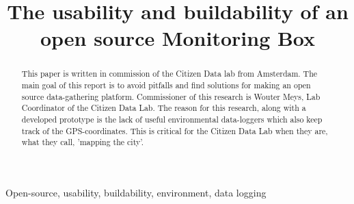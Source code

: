 \documentclass[conference]{IEEEtran}
\begin{document}
\title{The usability and buildability of an open source Monitoring Box}

\author{
	\and
		\and
		}
	

\maketitle	



\begin{abstract}
This paper is written in commission of the Citizen Data lab from Amsterdam. The main goal of this report is to avoid pitfalls and find solutions for making an open source data-gathering platform. Commissioner of this research is Wouter Meys, Lab Coordinator of the Citizen Data Lab. The reason for this research, along with a developed prototype is the lack of useful environmental data-loggers which also keep track of the GPS-coordinates. This is critical for the Citizen Data Lab when they are, what they call, 'mapping the city'. \\

\end{abstract}

\begin{IEEEkeywords}
Open-source, usability, buildability, environment, data logging
\end{IEEEkeywords}
\end{document}
